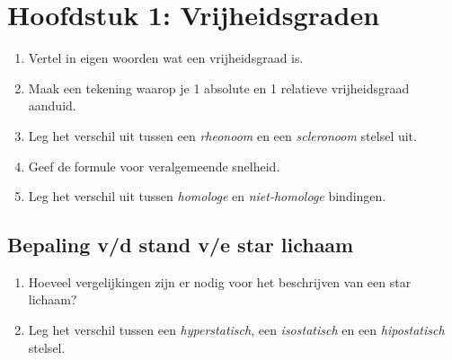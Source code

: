 \documentclass[12pt]{article}
\begin{document}
    \maketitle

	\section{Hoofdstuk 1: Vrijheidsgraden}%
	\label{sec:Hoofdstuk_1}
	\begin{enumerate}
		\item Vertel in eigen woorden wat een vrijheidsgraad is.
		\item Maak een tekening waarop je 1 absolute en 1 relatieve vrijheidsgraad aanduid.
		\item Leg het verschil uit tussen een \emph{rheonoom} en een \emph{scleronoom} stelsel uit.
		\item Geef de formule voor veralgemeende snelheid.
		\item Leg het verschil uit tussen \emph{homologe} en \emph{niet-homologe} bindingen.
	\end{enumerate}

	\subsection{Bepaling v/d stand v/e star lichaam}%
	\label{sub:Bepaling_v/d_stand_v/e_star_lichaam}
	\begin{enumerate}
		\item Hoeveel vergelijkingen zijn er nodig voor het beschrijven van een star lichaam?
		\item Leg het verschil tussen een \emph{hyperstatisch}, een \emph{isostatisch} en een \emph{hipostatisch} stelsel.
	\end{enumerate}
	
\end{document}
